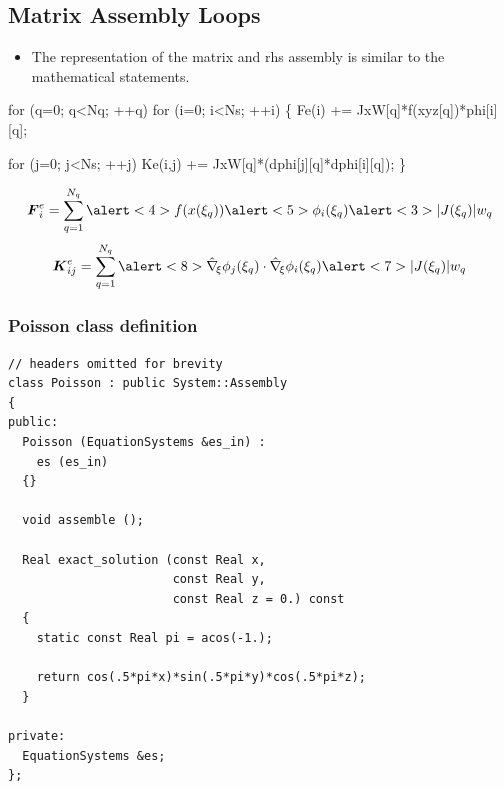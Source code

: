 \subsection*{Matrix Assembly Loops}
\begin{frame}[fragile,t]  
	\begin{block}{}
	  \begin{itemize}    
	  \item{ The \libmesh{} representation of the matrix and
	    rhs assembly is similar to the mathematical statements.
	  }
	  \end{itemize}
	\end{block}
\small
\begin{semiverbatim}
for (q=0; q<Nq; ++q) 
  for (i=0; i<Ns; ++i) \{
    \alert<2>{Fe(i)   += \alert<3>{JxW[q]}*\alert<4>{f(xyz[q])}*\alert<5>{phi[i][q]};}
    
    for (j=0; j<Ns; ++j)
      \alert<6>{Ke(i,j) += \alert<7>{JxW[q]}*(\alert<8>{dphi[j][q]*dphi[i][q]});}
  \}
\end{semiverbatim}
{
  \begin{equation}
    \nonumber
    \bv{F}^e_{i} = 
    \sum_{q=1}^{N_q}
    \alert<4>{f(x(\xi_q))}
    \alert<5>{\phi_i(\xi_q)}
    \alert<3>{|J(\xi_q)| w_q}
  \end{equation}
}
{
  \begin{equation}
  \nonumber
  \bv{K}^e_{ij} =
  \sum_{q=1}^{N_q}
  \alert<8>{
    \hat{\nabla}_{\!\xi} \phi_j(\xi_q) \cdot
    \hat{\nabla}_{\!\xi} \phi_i(\xi_q)
    }
  \alert<7>{|J(\xi_q)| w_q}
  \end{equation}
}
\end{frame}


\begin{frame}[allowframebreaks]
  
\end{frame}
 

\frame
{
  \Large
  \begin{block}{}
  \end{block}
}



\begin{frame}[fragile]
  \frametitle{Poisson class definition}

  \begin{lstlisting}
// headers omitted for brevity
class Poisson : public System::Assembly
{
public:
  Poisson (EquationSystems &es_in) :
    es (es_in)
  {}

  void assemble ();

  Real exact_solution (const Real x,
                       const Real y,
                       const Real z = 0.) const
  {
    static const Real pi = acos(-1.);

    return cos(.5*pi*x)*sin(.5*pi*y)*cos(.5*pi*z);
  }

private:
  EquationSystems &es;
};
  \end{lstlisting}
\end{frame}


